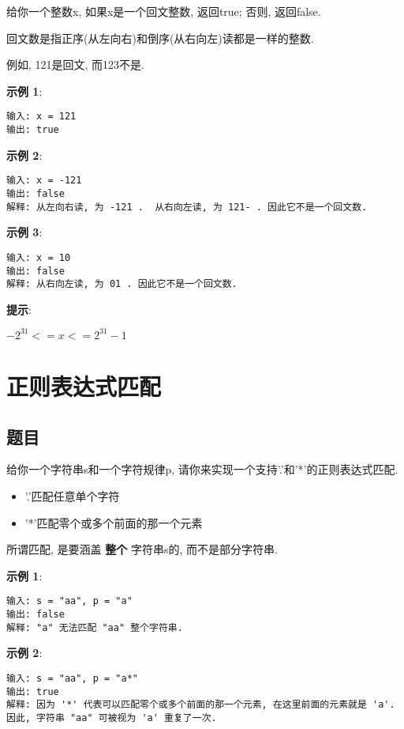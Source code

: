 \documentclass[oneside]{ctexbook}
\begin{document}
给你一个整数x, 如果x是一个回文整数, 返回true; 否则, 返回false.

回文数是指正序(从左向右)和倒序(从右向左)读都是一样的整数. 

例如, 121是回文, 而123不是. 

\textbf{示例 1}:

\begin{verbatim}
输入: x = 121
输出: true
\end{verbatim}

\textbf{示例 2}: 

\begin{verbatim}
输入: x = -121
输出: false
解释: 从左向右读, 为 -121 .  从右向左读, 为 121- . 因此它不是一个回文数. 
\end{verbatim}

\textbf{示例 3}: 

\begin{verbatim}
输入: x = 10
输出: false
解释: 从右向左读, 为 01 . 因此它不是一个回文数. 
\end{verbatim}

\textbf{提示}: 

$-2^{31} <= x <= 2^{31} - 1$

\chapter{正则表达式匹配}

\section{题目}

给你一个字符串s和一个字符规律p, 请你来实现一个支持'.'和'*'的正则表达式匹配.

\begin{itemize}
    \item '.'匹配任意单个字符
    \item '*'匹配零个或多个前面的那一个元素
\end{itemize}

所谓匹配, 是要涵盖 \textbf{整个} 字符串s的, 而不是部分字符串.

\textbf{示例 1}:

\begin{verbatim}
输入: s = "aa", p = "a"
输出: false
解释: "a" 无法匹配 "aa" 整个字符串. 
\end{verbatim}

\textbf{示例 2}:

\begin{verbatim}
输入: s = "aa", p = "a*"
输出: true
解释: 因为 '*' 代表可以匹配零个或多个前面的那一个元素, 在这里前面的元素就是 'a'. 因此, 字符串 "aa" 可被视为 'a' 重复了一次. 
\end{verbatim}
\end{document}
